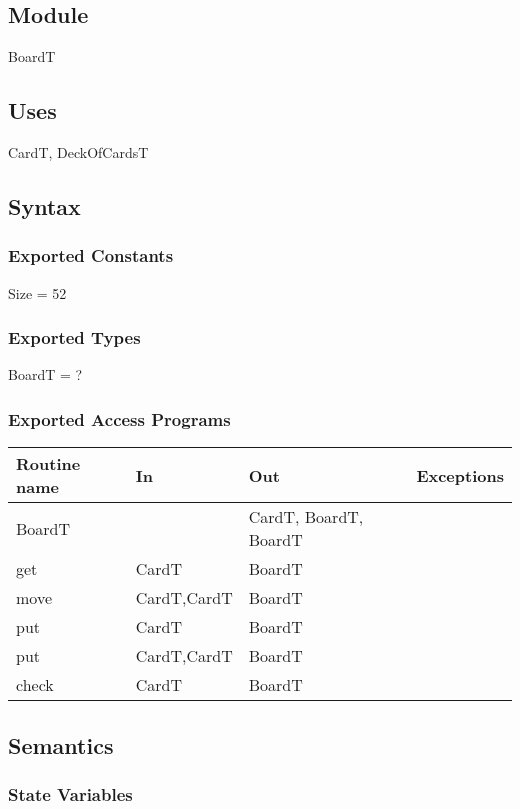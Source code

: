 \documentclass[12pt]{article}
\begin{document}
\subsection*{Module}
BoardT 
\subsection* {Uses}
CardT, DeckOfCardsT

\subsection* {Syntax}

\subsubsection* {Exported Constants}
Size = 52 \\
\subsubsection* {Exported Types}
BoardT = ?
\subsubsection* {Exported Access Programs}

\begin{tabular}{| l | l | l | p{7cm} |}
	\hline
	\textbf{Routine name} & \textbf{In} & \textbf{Out} & \textbf{Exceptions}\\
	
	\hline
	BoardT &  & CardT, BoardT, BoardT  & \\
	\hline
	get & CardT & BoardT & \\
	\hline
	move & CardT,CardT & BoardT & \\
	\hline
	put & CardT & BoardT & \\
	\hline
	put & CardT,CardT & BoardT & \\
	\hline
	check & CardT  & BoardT \\
	\hline
	
\end{tabular}

\subsection* {Semantics}

\subsubsection* {State Variables}
\end{document}
